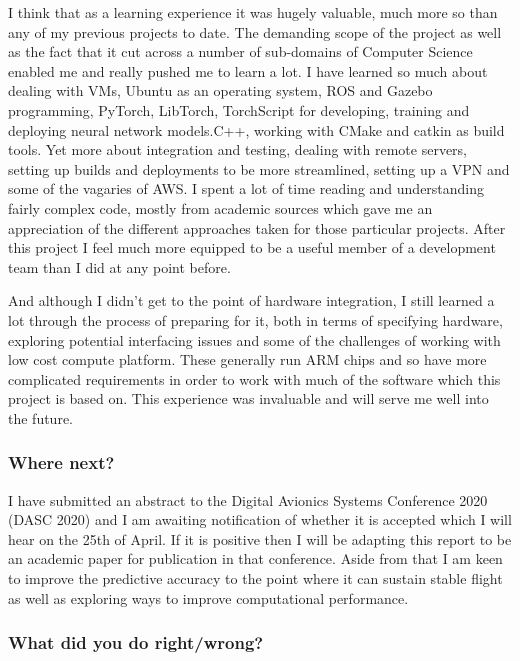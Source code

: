 \documentclass[]{../resources/final_report}
\begin{document}
I think that as a learning experience it was hugely valuable, much more so than any of my previous projects to date. The demanding scope of the project as well as the fact that it cut across a number of sub-domains of Computer Science enabled me and really pushed me to learn a lot. I have learned so much about dealing with VMs, Ubuntu as an operating system, ROS and Gazebo programming, PyTorch, LibTorch, TorchScript for developing, training and deploying neural network models.C++, working with CMake and catkin as build tools. Yet more about integration and testing, dealing with remote servers, setting up builds and deployments to be more streamlined, setting up a VPN and some of the vagaries of AWS. I spent a lot of time reading and understanding fairly complex code, mostly from academic sources which gave me an appreciation of the different approaches taken for those particular projects. After this project I feel much more equipped to be a useful member of a development team than I did at any point before.

And although I didn't get to the point of hardware integration, I still learned a lot through the process of preparing for it, both in terms of specifying hardware, exploring potential interfacing issues and some of the challenges of working with low cost compute platform. These generally run ARM chips and so have more complicated requirements in order to work with much of the software which this project is based on. This experience was invaluable and will serve me well into the future.

\subsubsection{Where next?}
I have submitted an abstract to the Digital Avionics Systems Conference 2020 (DASC 2020) and I am awaiting notification of whether it is accepted which I will hear on the 25th of April. If it is positive then I will be adapting this report to be an academic paper for publication in that conference. Aside from that I am keen to improve the predictive accuracy to the point where it can sustain stable flight as well as exploring ways to improve computational performance.


\subsubsection{What did you do right/wrong?}
\end{document}
